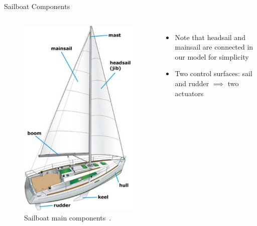 \documentclass[10pt,xcolor={table,dvipsnames},t]{beamer}
\begin{document}
\begin{frame}{Sailboat Components}
\begin{columns}
    \begin{figure}
        \centering
        \includegraphics[height = 0.6\textheight, keepaspectratio]{documents/figures/alves_sailboat.png}
        \caption{Sailboat main components~\cite{Alves2010}.}
        \label{fig:my_label}
    \end{figure}
\begin{itemize}
    \item Note that headsail and mainsail are connected in our model for simplicity
    \item Two control surfaces: sail and rudder \(\implies\) two actuators
\end{itemize}
\end{columns}

\end{frame}
\end{document}
